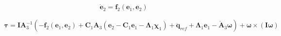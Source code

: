 \[
\dot{\mathbf{e}}_2 = \mathbf{f}_2 \left( \mathbf{e}_1, \mathbf{e}_2 \right)
\]



\begin{align}
\nonumber
\boldsymbol\tau 
=
\mathbf{I} \mathbf{A}_3^{-1}
\left(
	-\mathbf{f}_2 \left( \mathbf{e}_1, \mathbf{e}_2 \right)
	+ \mathbf{C}_1 \mathbf{A}_3 \left(
		\mathbf{e}_2 - \mathbf{C}_1 \mathbf{e}_1 - \boldsymbol\Lambda_1 \boldsymbol\chi_1
	\right)
	+ \ddot{\mathbf{q}}_{ref}
	+ \boldsymbol\Lambda_1 \mathbf{e}_1
	- \dot{\mathbf{A}}_3 \boldsymbol\omega
\right)
+ \boldsymbol\omega \times \left( \mathbf{I} \boldsymbol\omega \right)
\end{align}



